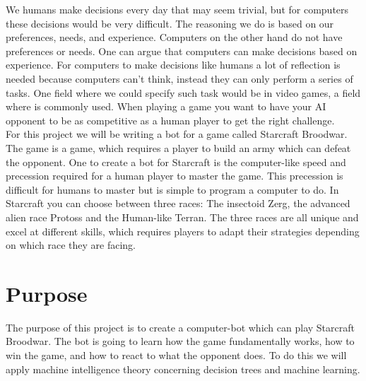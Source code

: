 	We humans make decisions every day that may seem trivial, but for computers these decisions would be very difficult. The reasoning we do 
	is based on our preferences, needs, and experience. Computers on the other hand do not have preferences or needs. One can argue that computers can
	make decisions based on experience.
	For computers to make decisions like humans a lot of reflection is needed because computers can't think, instead they can only perform a series of tasks.
	One field where we could specify such task would be in video games, a field where \abai is commonly used. When playing 
	a game you want to have your AI opponent to be as competitive as a human player to get the right challenge. \\
	
	For this project we will be writing a bot for a game called Starcraft Broodwar. The game is a \abrts game, which requires a player to build an army 
	which can defeat the opponent. One to create a bot for Starcraft is the computer-like speed and precession required for a human player to master the game. 
	This precession is difficult for humans to master but is simple to program a computer to do.
	In Starcraft you can choose between three races: The insectoid Zerg, the advanced alien race Protoss and the Human-like Terran. 
	The three races are all unique and excel at different skills, which requires players to adapt their strategies depending on which race they are facing.


\section{Purpose}
	The purpose of this project is to create a computer-bot which can play Starcraft Broodwar. 
	The bot is going to learn how the game fundamentally works, 
	how to win the game, and how to react to what the opponent does. 
	To do this we will apply machine intelligence theory concerning decision trees and machine learning.


